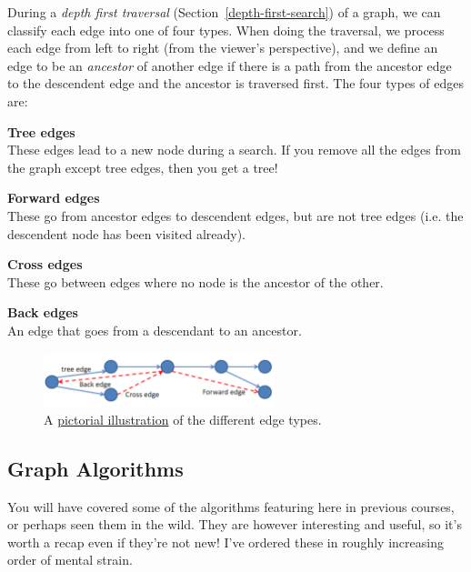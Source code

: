 During a \textit{depth first traversal} (Section~\ref{depth-first-search}) of a
graph, we can classify each edge into one of four types. When doing the
traversal, we process each edge from left to right (from the viewer's
perspective), and we define an edge to be an \textit{ancestor} of another edge
if there is a path from the ancestor edge to the descendent edge and the ancestor
is traversed first. The four types of edges are:

\begin{description}
  \item \textbf{Tree edges}\\
    These edges lead to a new node during a search. If you remove all the edges 
    from the graph except tree edges, then you get a tree!
  \item \textbf{Forward edges}\\
    These go from ancestor edges to descendent edges, but are not tree edges
    (i.e. the descendent node has been visited already).
  \item \textbf{Cross edges}\\
    These go between edges where no node is the ancestor of the other.
  \item \textbf{Back edges}\\
    An edge that goes from a descendant to an ancestor.
\end{description}

\begin{figure}[h]
  \centering
  \includegraphics[width=0.6\textwidth]{images/edge-types}
  \caption{A
  \href{http://courses.csail.mit.edu/6.006/spring11/rec/rec13.pdf}{pictorial
  illustration} of the different edge types.}
  \label{fig:connected-graph-edge}
\end{figure}

\subsection{Graph Algorithms}

You will have covered some of the algorithms featuring here in previous courses,
or perhaps seen them in the wild. They are however interesting and useful, so
it's worth a recap even if they're not new! I've ordered these in roughly
increasing order of mental strain.

